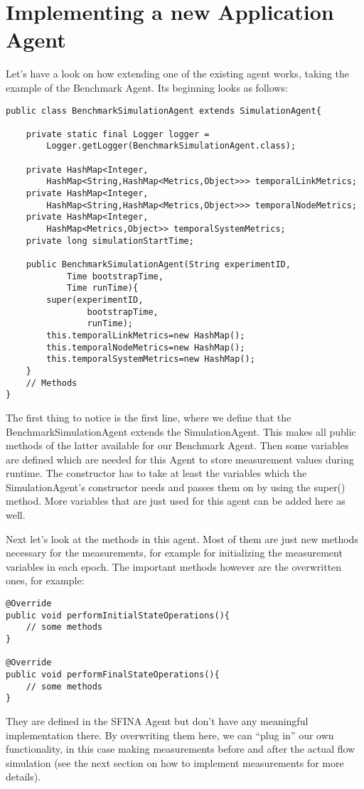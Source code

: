 \documentclass[11pt,fleqn]{book} %
\begin{document}
\section{Implementing a new Application Agent}
Let’s have a look on how extending one of the existing agent works, taking the example of the Benchmark Agent. Its beginning looks as follows:
\begin{lstlisting}[frame=single]
public class BenchmarkSimulationAgent extends SimulationAgent{
    
    private static final Logger logger = 
    	Logger.getLogger(BenchmarkSimulationAgent.class);
    
    private HashMap<Integer,
    	HashMap<String,HashMap<Metrics,Object>>> temporalLinkMetrics;
    private HashMap<Integer,
    	HashMap<String,HashMap<Metrics,Object>>> temporalNodeMetrics;
    private HashMap<Integer,
    	HashMap<Metrics,Object>> temporalSystemMetrics;
    private long simulationStartTime;
    
    public BenchmarkSimulationAgent(String experimentID, 
            Time bootstrapTime, 
            Time runTime){
        super(experimentID,
                bootstrapTime,
                runTime);
        this.temporalLinkMetrics=new HashMap();
        this.temporalNodeMetrics=new HashMap();
        this.temporalSystemMetrics=new HashMap();
    }
    // Methods
}
\end{lstlisting}
The first thing to notice is the first line, where we define that the BenchmarkSimulationAgent extends the SimulationAgent. This makes all public methods of the latter available for our Benchmark Agent. Then some variables are defined which are needed for this Agent to store measurement values during runtime. The constructor has to take at least the variables which the SimulationAgent’s constructor needs and passes them on by using the super() method. More variables that are just used for this agent can be added here as well.

Next let’s look at the methods in this agent. Most of them are just new methods necessary for the measurements, for example for initializing the measurement variables in each epoch. The important methods however are the overwritten ones, for example:
\begin{lstlisting}[frame=single]
@Override
public void performInitialStateOperations(){
	// some methods
}
    
@Override
public void performFinalStateOperations(){
	// some methods
}
\end{lstlisting}
They are defined in the SFINA Agent but don’t have any meaningful implementation there. By overwriting them here, we can “plug in” our own functionality, in this case making measurements before and after the actual flow simulation (see the next section on how to implement measurements for more details).
\end{document}
